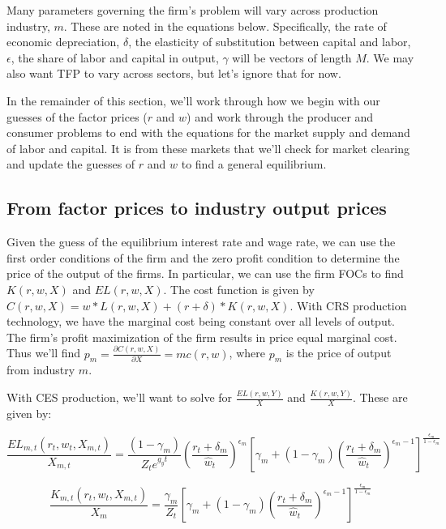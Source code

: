 \documentclass[letterpaper,12pt]{article}
\theoremstyle{definition}
\begin{document}
Many parameters governing the firm's problem will vary across production industry, $m$.  These are noted in the equations below.  Specifically, the rate of economic depreciation, $\delta$, the elasticity of substitution between capital and labor, $\epsilon$, the share of labor and capital in output, $\gamma$ will be vectors of length $M$.  We may also want TFP to vary across sectors, but let's ignore that for now.

In the remainder of this section, we'll work through how we begin with our guesses of the factor prices ($r$ and $w$) and work through the producer and consumer problems to end with the equations for the market supply and demand of labor and capital.  It is from these markets that we'll check for market clearing and update the guesses of $r$ and $w$ to find a general equilibrium.

\subsection*{From factor prices to industry output prices}

Given the guess of the equilibrium interest rate and wage rate, we can use the first order conditions of the firm and the zero profit condition to determine the price of the output of the firms.  In particular, we can use the firm FOCs to find $K(r,w,X)$ and $EL(r,w,X)$.  The cost function is given by $C(r,w,X) = w*L(r,w,X) + (r+\delta)*K(r,w,X)$.  With CRS production technology, we have the marginal cost being constant over all levels of output.  The firm's profit maximization of the firm results in price equal marginal cost.  Thus we'll find $p_{m} = \frac{\partial C(r,w,X)}{\partial X} = mc(r,w)$, where $p_{m}$ is the price of output from industry $m$.

With CES production, we'll want to solve for $\frac{EL(r,w,Y)}{X}$ and $\frac{K(r,w,Y)}{X}$.  These are given by:

\begin{equation}
\frac{EL_{m,t}(r_{t},w_{t},X_{m,t})}{X_{m,t}}= \frac{(1-\gamma_{m})}{Z_{t}e^{g_{y}t}}\left(\frac{r_{t}+\delta_{m}}{\hat{w}_{t}}\right)^{\epsilon_{m}}\left[\gamma_{m} + (1-\gamma_{m})\left(\frac{r_{t}+\delta_{m}}{\hat{w}_{t}}\right)^{\epsilon_{m}-1}\right]^{\frac{\epsilon_{m}}{1-\epsilon_{m}}}
\end{equation}

\begin{equation}
\frac{K_{m,t}(r_{t},w_{t},X_{m,t})}{X_{m}}= \frac{\gamma_{m}}{Z_{t}}\left[\gamma_{m} + (1-\gamma_{m})\left(\frac{r_{t}+\delta_{m}}{\hat{w}_{t}}\right)^{\epsilon_{m}-1}\right]^{\frac{\epsilon_{m}}{1-\epsilon_{m}}}
\end{equation}
\end{document}
